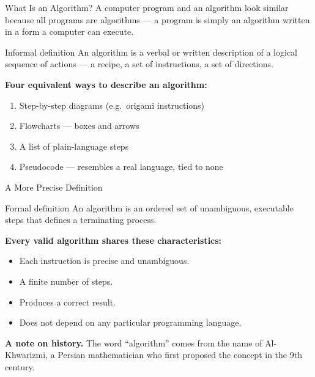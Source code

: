 \documentclass[9pt,aspectratio=169,xcolor=table]{beamer}
\begin{document}
\begin{frame}{What Is an Algorithm?}
    \leavevmode
    A computer program and an algorithm look similar because
    \alert{all programs are algorithms} --- a program is simply an
    algorithm written in a form a computer can execute.

    \vspace{2mm}
    \begin{block}{Informal definition}
        An algorithm is a verbal or written description of a logical
        sequence of actions --- a recipe, a set of instructions, a set
        of directions.
    \end{block}

    \vspace{2mm}
    \textbf{Four equivalent ways to describe an algorithm:}
    \begin{enumerate}\itemsep1pt
        \item Step-by-step diagrams (e.g.\ origami instructions)
        \item \alert{Flowcharts} --- boxes and arrows
        \item A list of plain-language steps
        \item \alert{Pseudocode} --- resembles a real language, tied to none
    \end{enumerate}
\end{frame}

\begin{frame}{A More Precise Definition}
    \leavevmode
    \begin{block}{Formal definition}
        An \alert{algorithm} is an ordered set of unambiguous, executable
        steps that defines a terminating process.
    \end{block}

    \vspace{2mm}
    \textbf{Every valid algorithm shares these characteristics:}
    \begin{itemize}\itemsep2pt
        \item Each instruction is precise and unambiguous.
        \item A finite number of steps.
        \item Produces a correct result.
        \item Does not depend on any particular programming language.
    \end{itemize}

    \vspace{3mm}
    {\small \textbf{A note on history.} The word ``algorithm'' comes from
    the name of Al-Khwarizmi, a Persian mathematician who first proposed
    the concept in the 9th century.}
\end{frame}
\end{document}
